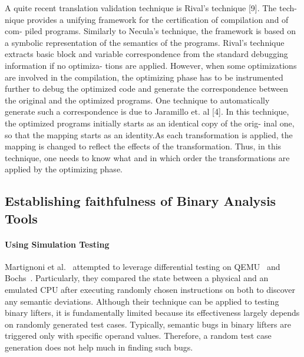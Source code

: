 A quite recent translation validation technique is Rival’s technique [9]. The tech-
nique provides a unifying framework for the certification of compilation and of com- piled programs. Similarly to Necula’s technique, the framework is based on a symbolic representation of the semantics of the programs. Rival’s technique extracts basic block and variable correspondence from the standard debugging information if no optimiza- tions are applied. However, when some optimizations are involved in the compilation, the optimizing phase has to be instrumented further to debug the optimized code and generate the correspondence between the original and the optimized programs. One technique to automatically generate such a correspondence is due to Jaramillo et. al [4]. In this technique, the optimized programs initially starts as an identical copy of the orig- inal one, so that the mapping starts as an identity.As each transformation is applied, the mapping is changed to reflect the effects of the transformation. Thus, in this technique, one needs to know what and in which order the transformations are applied by the optimizing phase.  

\subsection{Establishing faithfulness of Binary Analysis Tools}

\paragraph{Using Simulation Testing}
Martignoni et al.~\cite{Martignoni:ISSTA2009, Martignoni:ISSTA2010} attempted to leverage differential testing on QEMU~\cite{QEMU:USENIX05} and Bochs~\cite{Bochs1996}. Particularly, they compared the state between a physical and an emulated CPU after executing randomly chosen instructions on both to discover any semantic deviations. Although their technique can be applied to testing binary lifters, it is fundamentally limited because its effectiveness largely depends on randomly generated test cases. Typically, semantic bugs in binary lifters are triggered only with specific operand values. Therefore, a random test case generation does not help much in finding such bugs.

